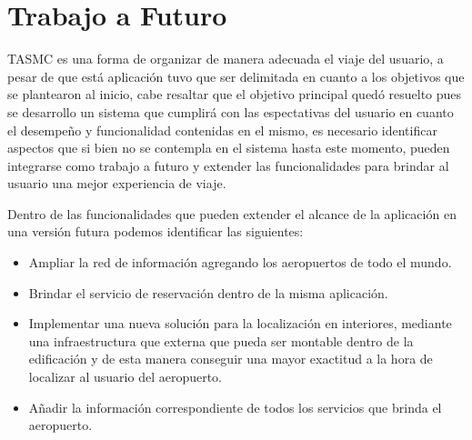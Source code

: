 
\chapter{Trabajo a Futuro} %

\label{TrabajoFuturo} %


TASMC es una forma de organizar de manera adecuada el viaje del usuario, a pesar de que está aplicación tuvo que ser delimitada en  
cuanto a los objetivos que se plantearon al inicio, cabe resaltar que el objetivo principal quedó resuelto pues se desarrollo un sistema
que cumplirá con las espectativas del usuario en cuanto el desempeño y funcionalidad contenidas en el mismo, es necesario identificar aspectos 
que si bien no se contempla en el sistema hasta este momento, pueden integrarse como trabajo a futuro y extender las funcionalidades 
para brindar al usuario una mejor experiencia de viaje.

Dentro de las funcionalidades que pueden extender el alcance de la aplicación en una versión futura podemos identificar las 
siguientes: 

\begin{itemize}
 \item Ampliar la red de información agregando los aeropuertos de todo el mundo.
 \item Brindar el servicio de reservación dentro de la misma aplicación.
 \item Implementar una nueva solución para la localización en interiores, mediante una infraestructura que externa que pueda ser 
 montable dentro de la edificación y de esta manera conseguir una mayor exactitud a la hora de localizar al usuario del aeropuerto.
 \item Añadir la información correspondiente de todos los servicios que brinda el aeropuerto.
\end{itemize}
